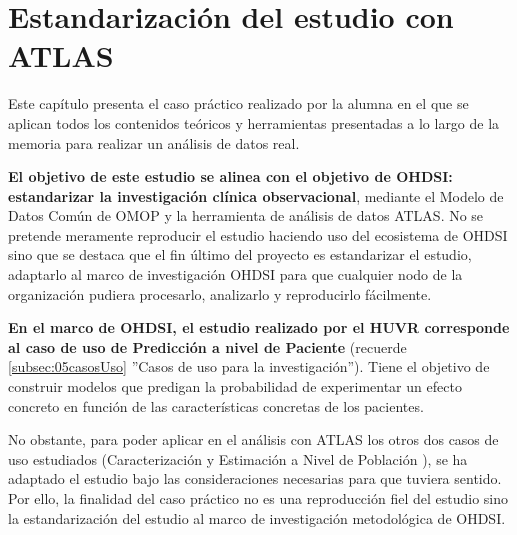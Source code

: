 \section{Estandarización del estudio con ATLAS} \label{sec:09atlas}

Este capítulo presenta el caso práctico realizado por la alumna en el que se aplican todos los contenidos teóricos y herramientas presentadas a lo largo de la memoria para realizar un análisis de datos real.


\textbf{El objetivo de este estudio se alinea con el objetivo de OHDSI: estandarizar la investigación clínica observacional}, mediante el Modelo de Datos Común de OMOP y la herramienta de análisis de datos ATLAS. No se pretende meramente reproducir el estudio haciendo uso del ecosistema de OHDSI sino que se destaca que el fin último del proyecto es estandarizar el estudio, adaptarlo al marco de investigación OHDSI para que cualquier nodo de la organización pudiera procesarlo, analizarlo y reproducirlo fácilmente. 


\textbf{En el marco de OHDSI, el estudio realizado por el HUVR  corresponde al caso de uso de Predicción a nivel de Paciente} (recuerde \ref{subsec:05casosUso} ''Casos de uso para la investigación''). Tiene el objetivo de construir modelos que predigan la probabilidad de experimentar un efecto concreto en función de las características concretas de los pacientes. 

No obstante, para poder aplicar en el análisis con ATLAS los otros dos casos de uso estudiados (Caracterización y Estimación a Nivel de Población ), se ha adaptado el estudio bajo las consideraciones necesarias para que tuviera sentido. Por ello, la finalidad del caso práctico no es una reproducción fiel del estudio sino la estandarización del estudio al marco de investigación metodológica de OHDSI.



